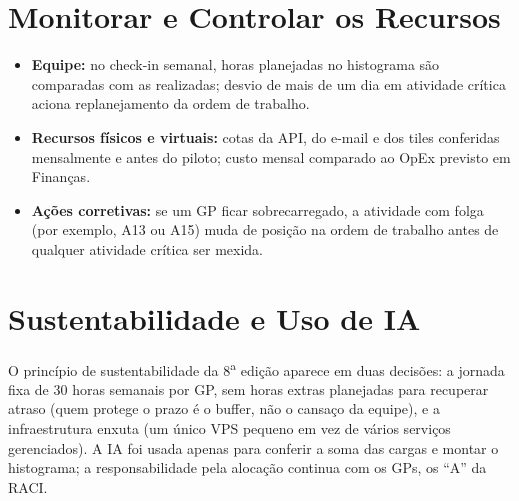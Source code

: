 \documentclass[11pt,a4paper]{article}
\begin{document}
\section{Monitorar e Controlar os Recursos}
\begin{itemize}[itemsep=2pt]
  \item \textbf{Equipe:} no check-in semanal, horas planejadas no histograma são comparadas com as realizadas; desvio de mais de um dia em atividade crítica aciona replanejamento da ordem de trabalho.
  \item \textbf{Recursos físicos e virtuais:} cotas da API, do e-mail e dos tiles conferidas mensalmente e antes do piloto; custo mensal comparado ao OpEx previsto em Finanças.
  \item \textbf{Ações corretivas:} se um GP ficar sobrecarregado, a atividade com folga (por exemplo, A13 ou A15) muda de posição na ordem de trabalho antes de qualquer atividade crítica ser mexida.
\end{itemize}

\section{Sustentabilidade e Uso de IA}
O princípio de sustentabilidade da 8\textsuperscript{a} edição aparece em duas decisões: a jornada fixa de 30 horas semanais por GP, sem horas extras planejadas para recuperar atraso (quem protege o prazo é o buffer, não o cansaço da equipe), e a infraestrutura enxuta (um único VPS pequeno em vez de vários serviços gerenciados). A IA foi usada apenas para conferir a soma das cargas e montar o histograma; a responsabilidade pela alocação continua com os GPs, os ``A'' da RACI.
\end{document}
